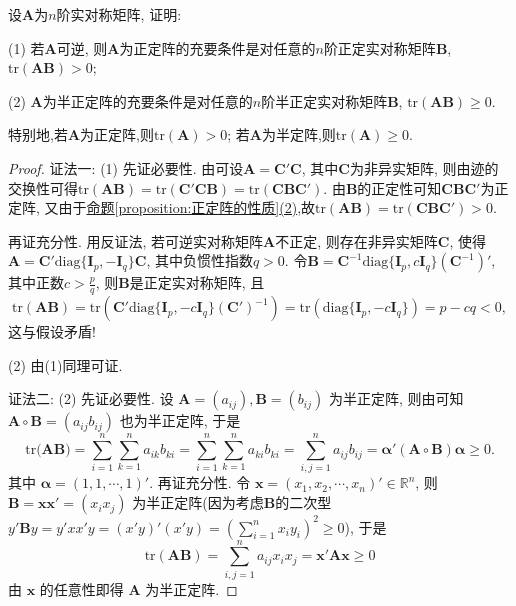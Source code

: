 \documentclass[../../main.tex]{subfiles}%
\begin{document}
\begin{proposition}\label{proposition:正定和半正定阵关于迹的判定准则}
设$\boldsymbol{A}$为$n$阶实对称矩阵, 证明:

(1) 若$\boldsymbol{A}$可逆, 则$\boldsymbol{A}$为正定阵的充要条件是对任意的$n$阶正定实对称矩阵$\boldsymbol{B}$, $\text{tr}(\boldsymbol{A}\boldsymbol{B})>0$;

(2) $\boldsymbol{A}$为半正定阵的充要条件是对任意的$n$阶半正定实对称矩阵$\boldsymbol{B}$, $\text{tr}(\boldsymbol{A}\boldsymbol{B})\geqslant  0$.
\end{proposition}
\begin{remark}
特别地,若$\boldsymbol{A}$为正定阵,则$\text{tr}(\boldsymbol{A})>0$;
若$\boldsymbol{A}$为半定阵,则$\text{tr}(\boldsymbol{A})\geqslant  0$.
\end{remark}
\begin{proof}

{\color{blue}证法一:}
(1) 先证必要性. 由可设$\boldsymbol{A}=\boldsymbol{C}'\boldsymbol{C}$, 其中$\boldsymbol{C}$为非异实矩阵, 则由迹的交换性可得$\text{tr}(\boldsymbol{A}\boldsymbol{B}) = \text{tr}(\boldsymbol{C}'\boldsymbol{C}\boldsymbol{B}) = \text{tr}(\boldsymbol{C}\boldsymbol{B}\boldsymbol{C}')$. 由$\boldsymbol{B}$的正定性可知$\boldsymbol{C}\boldsymbol{B}\boldsymbol{C}'$为正定阵, 又由于\hyperref[proposition:正定阵的性质]{命题\ref{proposition:正定阵的性质}(2)},故$\text{tr}(\boldsymbol{A}\boldsymbol{B}) = \text{tr}(\boldsymbol{C}\boldsymbol{B}\boldsymbol{C}')>0$.

再证充分性. 用反证法, 若可逆实对称矩阵$\boldsymbol{A}$不正定, 则存在非异实矩阵$\boldsymbol{C}$, 使得$\boldsymbol{A}=\boldsymbol{C}'\text{diag}\{\boldsymbol{I}_p, -\boldsymbol{I}_q\}\boldsymbol{C}$, 其中负惯性指数$q > 0$. 令$\boldsymbol{B}=\boldsymbol{C}^{-1}\text{diag}\{\boldsymbol{I}_p, c\boldsymbol{I}_q\}(\boldsymbol{C}^{-1})'$, 其中正数$c > \frac{p}{q}$, 则$\boldsymbol{B}$是正定实对称矩阵, 且
\[
\text{tr}(\boldsymbol{A}\boldsymbol{B}) = \text{tr}\left(\boldsymbol{C}'\text{diag}\{\boldsymbol{I}_p, -c\boldsymbol{I}_q\}(\boldsymbol{C}')^{-1}\right) = \text{tr}(\text{diag}\{\boldsymbol{I}_p, -c\boldsymbol{I}_q\}) = p - cq < 0,
\]
这与假设矛盾!

(2) 由(1)同理可证. 

{\color{blue}证法二:}
(2) 先证必要性. 设 \(\boldsymbol{A}=(a_{ij}),\boldsymbol{B}=(b_{ij})\) 为半正定阵, 则由可知 \(\boldsymbol{A}\circ\boldsymbol{B}=(a_{ij}b_{ij})\) 也为半正定阵, 于是
\[\mathrm{tr(}\boldsymbol{AB})=\sum_{i=1}^n{\sum_{k=1}^n{a_{ik}b_{ki}}}=\sum_{i=1}^n{\sum_{k=1}^n{a_{ki}b_{ki}}}=\sum_{i,j=1}^n{a_{ij}b_{ij}}=\boldsymbol{\alpha }'(\boldsymbol{A}\circ \boldsymbol{B})\boldsymbol{\alpha }\geqslant 0.\]
其中 \(\boldsymbol{\alpha}=(1,1,\cdots,1)'\). 再证充分性. 令 \(\boldsymbol{x}=(x_1,x_2,\cdots,x_n)'\in\mathbb{R}^n\), 则 \(\boldsymbol{B}=\boldsymbol{x}\boldsymbol{x}'=(x_ix_j)\) 为半正定阵(因为考虑$\boldsymbol{B}$的二次型$y'\boldsymbol{B}y=y'xx'y=(x'y)'(x'y)=\left( \sum_{i=1}^n{x_iy_i} \right) ^2\geqslant 0$), 于是
\[\mathrm{tr}(\boldsymbol{A}\boldsymbol{B})=\sum_{i,j = 1}^{n}a_{ij}x_ix_j=\boldsymbol{x}'\boldsymbol{A}\boldsymbol{x}\geqslant 0\]
由 \(\boldsymbol{x}\) 的任意性即得 \(\boldsymbol{A}\) 为半正定阵.


\end{proof}
\end{document}
